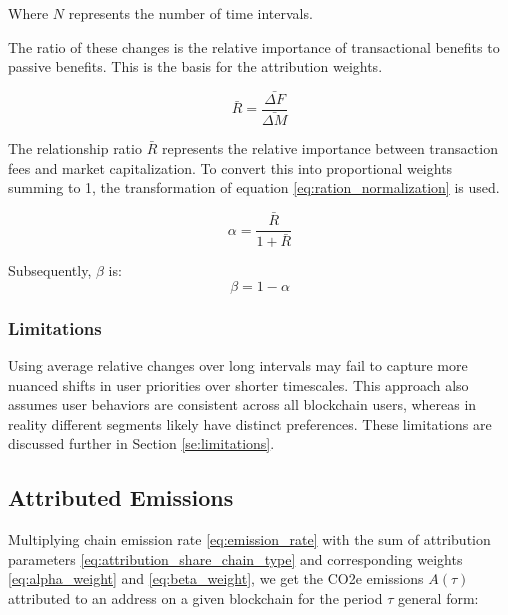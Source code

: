 \documentclass[11pt]{report}
\begin{document}


Where \( N \) represents the number of time intervals.

The ratio of these changes is the relative importance of transactional benefits to passive benefits. This is the basis for the attribution weights.

\begin{equation} \label{eq:weights_ratio}
    \bar{R} = \frac{\bar{\Delta F}}{\bar{\Delta M}}
\end{equation}

The relationship ratio $\bar{R}$ represents the relative importance between transaction fees and market capitalization. To convert this into proportional weights summing to 1, the transformation of equation \eqref{eq:ration_normalization} is used.

\begin{equation} \label{eq:alpha_weight}
    \alpha = \frac{\bar{R}}{1 + \bar{R}}
\end{equation}

Subsequently, \( \beta \) is:
\begin{equation} \label{eq:beta_weight}
    \beta = 1 - \alpha
\end{equation}


\subsubsection{Limitations}
Using average relative changes over long intervals may fail to capture more nuanced shifts in user priorities over shorter timescales. This approach also assumes user behaviors are consistent across all blockchain users, whereas in reality different segments likely have distinct preferences. These limitations are discussed further in Section \ref{se:limitations}.





\subsection{Attributed Emissions}

Multiplying chain emission rate \eqref{eq:emission_rate} with the sum of attribution parameters \eqref{eq:attribution_share_chain_type} and corresponding weights \eqref{eq:alpha_weight} and \eqref{eq:beta_weight}, we get the CO2e emissions \(A(\tau)\) attributed to an address on a given blockchain for the period $\tau$ general form:
\end{document}
